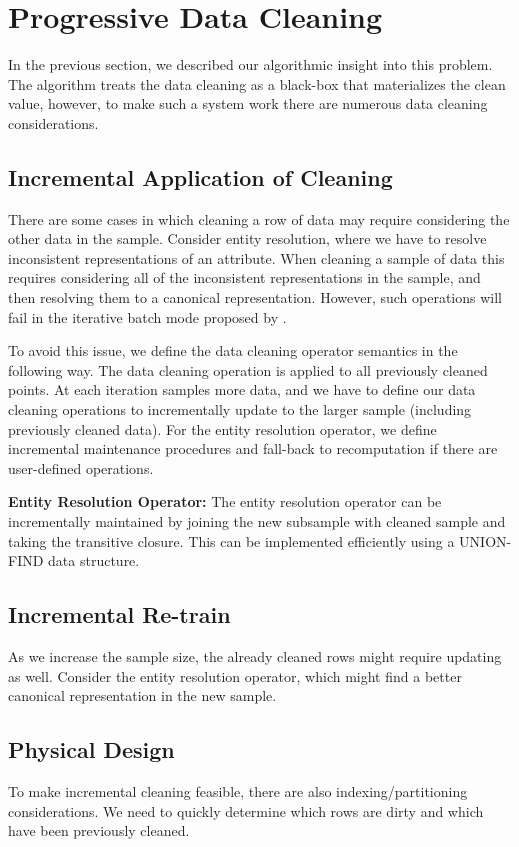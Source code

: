 \section{Progressive Data Cleaning}
In the previous section, we described our algorithmic insight into this problem.
The algorithm treats the data cleaning as a black-box that materializes the clean value,
however, to make such a system work there are numerous data cleaning considerations.

\subsection{Incremental Application of Cleaning}
There are some cases in which cleaning a row of data may require considering the other data in the sample.
Consider entity resolution, where we have to resolve inconsistent representations of an attribute.
When cleaning a sample of data this requires considering all of the inconsistent representations in the sample, and then resolving them to a canonical representation.
However, such operations will fail in the iterative batch mode proposed by \sys.

To avoid this issue, we define the data cleaning operator semantics in the following way.
The data cleaning operation is applied to all previously cleaned points.
At each iteration \sys samples more data, and we have to define our data cleaning operations to incrementally update to the larger sample (including previously cleaned data).
For the entity resolution operator, we define incremental maintenance procedures and fall-back to recomputation if there are user-defined operations.

\noindent \textbf{Entity Resolution Operator: } The entity resolution operator can be incrementally maintained by joining the new subsample with cleaned sample and taking the transitive closure. This can be implemented efficiently using a UNION-FIND data structure.

\subsection{Incremental Re-train}
As we increase the sample size, the already cleaned rows might require updating as well. 
Consider the entity resolution operator, which might find a better canonical representation 
in the new sample.


\subsection{Physical Design}
To make incremental cleaning feasible, there are also indexing/partitioning considerations.
We need to quickly determine which rows are dirty and which have been previously cleaned.

